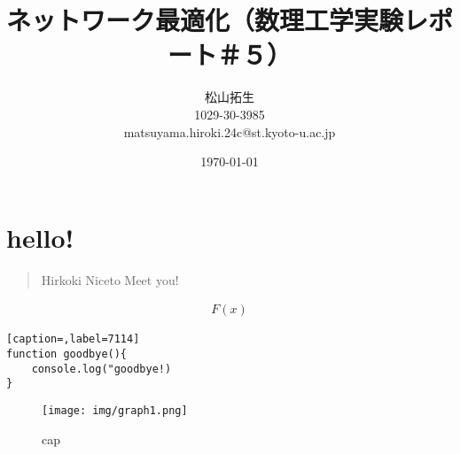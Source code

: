 \documentclass{jsarticle}
\title{ネットワーク最適化（数理工学実験レポート＃５）}
\author{松山拓生 \\ 1029-30-3985 \\ matsuyama.hiroki.24c@st.kyoto-u.ac.jp}
\date{\today}
\begin{document}
\maketitle


\section{hello!}

\begin{quote}
Hirkoki
Niceto Meet you!
\end{quote}

\begin{gather}
F(x)
\end{gather}

\begin{lstlisting}[caption=,label=7114]
function goodbye(){
    console.log("goodbye!)
}
\end{lstlisting}


\begin{figure}[H]
\centering
\texttt{[image: img/graph1.png]}
\caption{cap}
\label{l-6658}
\end{figure}
\end{document}
